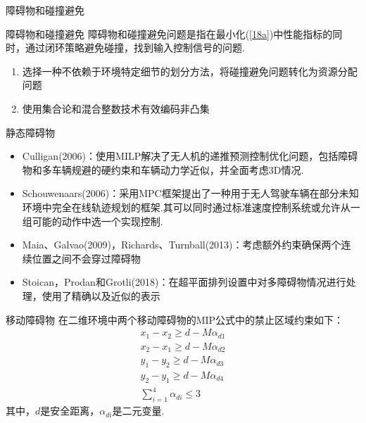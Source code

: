 \documentclass[notheorems,11pt]{beamer}
\theoremstyle{plain}
\numberwithin{theorem}{section}
\numberwithin{lemma}{section}
\numberwithin{corollary}{section}
\theoremstyle{example}
\begin{document}
\begin{frame}{障碍物和碰撞避免}
  \begin{block}{障碍物和碰撞避免}
    障碍物和碰撞避免问题是指在最小化(\ref{18a})中性能指标的同时，通过闭环策略避免碰撞，找到输入控制信号的问题.
  \end{block}
  \begin{enumerate}
    \item 选择一种不依赖于环境特定细节的划分方法，将碰撞避免问题转化为资源分配问题
    \item 使用集合论和混合整数技术有效编码非凸集
  \end{enumerate}
\end{frame}

\begin{frame}{静态障碍物}
  \begin{itemize}
    \item Culligan(2006)：使用MILP解决了无人机的递推预测控制优化问题，包括障碍物和多车辆规避的硬约束和车辆动力学近似，并全面考虑3D情况.
    \item Schouwenaars(2006)：采用MPC框架提出了一种用于无人驾驶车辆在部分未知环境中完全在线轨迹规划的框架.其可以同时通过标准速度控制系统或允许从一组可能的动作中选一个实现控制.
    \item Maia、Galvao(2009)，Richards、Turnball(2013)：考虑额外约束确保两个连续位置之间不会穿过障碍物
    \item Stoican，Prodan和Grotli(2018)：在超平面排列设置中对多障碍物情况进行处理，使用了精确以及近似的表示
  \end{itemize}
\end{frame}

\begin{frame}{移动障碍物}
  在二维环境中两个移动障碍物的MIP公式中的禁止区域约束如下：
  \begin{subequations}
    \begin{gather}
      x_1-x_2\geqslant d-M\alpha_{d1} \\
      x_2-x_1\geqslant d-M\alpha_{d2} \\
      y_1-y_2\geqslant d-M\alpha_{d3} \\
      y_2-y_1\geqslant d-M\alpha_{d4} \\
      \sum_{i=1}^4{\alpha_{di}}\leqslant 3
    \end{gather}
  \end{subequations}
  其中，$d$是安全距离，$\alpha_{di}$是二元变量.
\end{frame}
\end{document}
